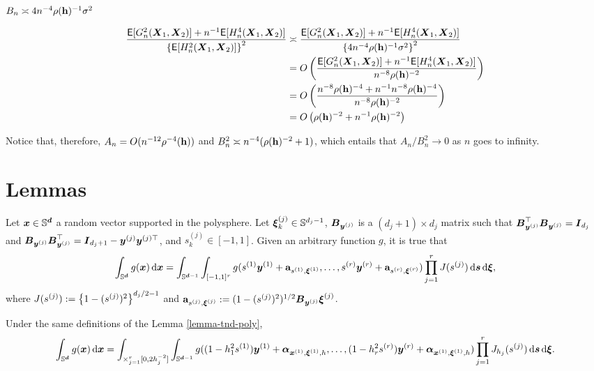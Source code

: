 \documentclass{article}
\begin{document}
$B_n\asymp 4 n^{-4}\rho(\mathbf h)^{-1} \sigma^2$


\begin{align*}
    \frac{\mathsf{E}[G_n^2(\boldsymbol{X}_1,\boldsymbol{X}_2)]+n^{-1}\mathsf{E}[H_n^4(\boldsymbol{X}_1,\boldsymbol{X}_2)]}{\left\{\mathsf{E}[H_n^2(\boldsymbol{X}_1,\boldsymbol{X}_2)]\right\}^2}&\asymp \frac{\mathsf{E}[G_n^2(\boldsymbol{X}_1,\boldsymbol{X}_2)]+n^{-1}\mathsf{E}[H_n^4(\boldsymbol{X}_1,\boldsymbol{X}_2)]}{\left\{4 n^{-4}\rho(\mathbf h)^{-1} \sigma^2\right\}^2}\\
    &=O\left(\frac{\mathsf{E}[G_n^2(\boldsymbol{X}_1,\boldsymbol{X}_2)]+n^{-1}\mathsf{E}[H_n^4(\boldsymbol{X}_1,\boldsymbol{X}_2)]}{n^{-8}\rho(\mathbf h)^{-2}}\right)\\
    &=O\left(\frac{n^{-8}\rho(\mathbf h)^{-4}+n^{-1} n^{-8} \rho(\mathbf h)^{-4}}{n^{-8}\rho(\mathbf h)^{-2}}\right)\\
    &=O\left(\rho(\mathbf h)^{-2}+n^{-1}  \rho(\mathbf h)^{-2}\right)\\
\end{align*}

Notice that, therefore, $A_n = O(n^{-12} \rho^{-4}(\mathbf h))$ and $B_n^2 \asymp n^{-4}(\rho(\mathbf h)^{-2}+1)$, which entails that $A_n / B_n^2 \to 0$ as $n$ goes to infinity.

\section{Lemmas}

\begin{lemma}\label{lemma-tnd-poly}
    Let $\boldsymbol{x} \in \mathbb{S}^{\boldsymbol{d}}$ a random vector supported in the polysphere. Let $\boldsymbol\xi_k^{(j)} \in \mathbb{S}^{d_j-1}$, $\boldsymbol{B}_{\boldsymbol{y}^{(j)}}$  is a $(d_j+1) \times d_j$ matrix such that $\boldsymbol{B}_{\boldsymbol{y}^{(j)}}^{\top} \boldsymbol{B}_{\boldsymbol{y}^{(j)}} = \boldsymbol{I}_{d_j}$ and $\boldsymbol{B}_{\boldsymbol{y}^{(j)}} \boldsymbol{B}_{\boldsymbol{y}^{(j)}}^{\top} = \boldsymbol{I}_{d_j+1} - \boldsymbol{y}^{(j)} \boldsymbol{y}^{(j) \top}$, and $s_k^{(j)} \in [-1,1]$. Given an arbitrary function $g$, it is true that
    \begin{align}
    \int_{\mathbb{S}^{\boldsymbol{d}}} g(\boldsymbol{x}) \,\mathrm{d} \boldsymbol{x} = \int_{\mathbb{S}^{\boldsymbol{d}-1}} \int_{[-1,1]^r} g(s^{(1)} \boldsymbol{y}^{(1)} + \mathbf{a}_{s^{(1)},\boldsymbol\xi^{(1)}},\ldots, s^{(r)} \boldsymbol{y}^{(r)} + \mathbf{a}_{s^{(r)},\boldsymbol\xi^{(r)}}) \prod_{j=1}^r J(s^{(j)}) \,\mathrm{d} \boldsymbol{s}\,\mathrm{d} \boldsymbol\xi,\label{eq:tnpoly}
\end{align}
where $J(s^{(j)}) := \left\{1 - (s^{(j)})^2\right\}^{d_j/2 -1}$ and $\mathbf{a}_{s^{(j)},\boldsymbol\xi^{(j)}}:= (1-(s^{(j)})^2)^{1/2} \boldsymbol{B}_{\boldsymbol{y}^{(j)}} \boldsymbol\xi^{(j)}$. 
\end{lemma}

\begin{lemma}\label{lemma-tnd2-poly}
    Under the same definitions of the Lemma \ref{lemma-tnd-poly},
    \begin{align}
    \int_{\mathbb{S}^{\boldsymbol{d}}} g(\boldsymbol{x}) \,\mathrm{d} \boldsymbol{x} = \int_{\times_{j=1}^r[0,2h_j^{-2}]} \int_{\mathbb{S}^{\boldsymbol{d}-1}} g((1-h^2_1s^{(1)}) \boldsymbol{y}^{(1)} + \boldsymbol\alpha_{\boldsymbol{x}^{(1)},\boldsymbol\xi^{(1)},h},\ldots, (1-h^2_r s^{(r)}) \boldsymbol{y}^{(r)} + \boldsymbol\alpha_{\boldsymbol{x}^{(1)},\boldsymbol\xi^{(1)},h}) \prod_{j=1}^r J_{h_j}(s^{(j)}) \,\mathrm{d} \boldsymbol{s}\,\mathrm{d} \boldsymbol\xi.\label{eq:tnpoly}
\end{align}
\end{lemma}
\end{document}
